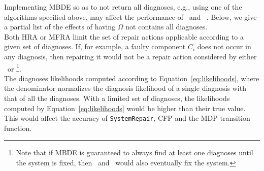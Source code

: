 Implementing MBDE so as to not return all diagnoses, e.g., using one of the algorithms specified above, may affect the performance of \myopic\ and \planbased\ .
Below, we give a partial list of the effects of having $\Omega$ not contains all diagnoses.\\
	 Both HRA or MFRA limit the set of repair actions applicable according to a given set of diagnoses. If, for example, a faulty component $C_i$ does not occur in any diagnosis, then repairing it would not be a repair action considered by either \myopic\ or \planbased\footnote{Note that if MBDE is guaranteed to always find at least one diagnoses until the system is fixed, then \myopic\ and \planbased\ would also eventually fix the system.}.\\
	 The diagnoses likelihoods computed according to Equation~\ref{eq:likelihoods}, where the denominator normalizes the diagnosis likelihood of a single diagnosis with that of all the diagnoses. With a limited set of diagnoses, the likelihoods computed by Equation~\ref{eq:likelihoods} would be higher than their true value. This would affect the accuracy of {\tt SystemRepair}, CFP and the MDP transition function.	

